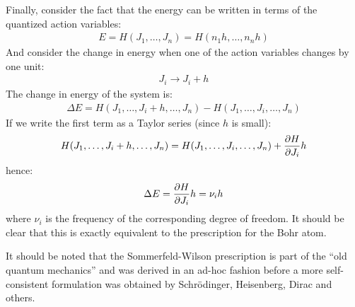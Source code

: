 Finally, consider the fact that the energy can be written in terms of the quantized action variables:
\begin{align}
E=H(J_1,\dots, J_n)=H(n_1h,\dots,n_nh)
\end{align}
And consider the change in energy when one of the action variables changes by one unit:
\begin{align}
J_i\to J_i+h
\end{align}
The change in energy of the system is:
\begin{align}
\Delta E= H(J_1,\dots,J_i+h,\dots, J_n)-H(J_1,\dots,J_i,\dots, J_n)
\end{align}
If we write the first term as a Taylor series (since $h$ is small):
\begin{align}
H(J_1,\dots,J_i+h,\dots, J_n)=H(J_1,\dots,J_i,\dots, J_n)+\frac{\partial H}{\partial J_i}h
\end{align}
hence:
\begin{align}
\Delta E=\frac{\partial H}{\partial J_i}h=\nu_i h
\end{align}
where $\nu_i$ is the frequency of the corresponding degree of freedom. It should be clear that this is exactly equivalent to the prescription for the Bohr atom.

It should be noted that the Sommerfeld-Wilson prescription is part of the ``old quantum mechanics'' and was derived in an ad-hoc fashion before a more self-consistent formulation was obtained by Schr\"odinger, Heisenberg, Dirac and others.

